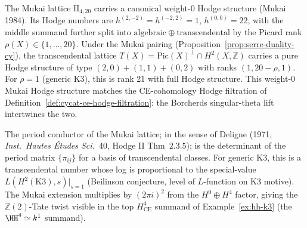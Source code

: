 \begin{remark}
\label{rem:dcy-mukai-hodge-conductor}
The Mukai lattice $\mathrm{II}_{4,20}$ carries a canonical weight-$0$
Hodge structure (Mukai 1984). Its Hodge numbers are
$h^{(2,-2)} = h^{(-2,2)} = 1$, $h^{(0,0)} = 22$, with the middle
summand further split into $\mathrm{algebraic}\oplus\mathrm{transcendental}$
by the Picard rank $\rho(X) \in \{1, \ldots, 20\}$. Under the Mukai
pairing (Proposition~\textup{\ref{prop:serre-duality-cy}}), the
transcendental lattice
$T(X) = \mathrm{Pic}(X)^\perp \cap H^2(X,\mathbb{Z})$ carries a pure
Hodge structure of type $(2,0) + (1,1) + (0,2)$ with ranks
$(1, 20 - \rho, 1)$. For $\rho = 1$ (generic K3), this is rank 21
with full Hodge structure. This weight-$0$ Mukai Hodge structure
matches the CE-cohomology Hodge filtration of
Definition~\textup{\ref{def:cycat-ce-hodge-filtration}}:
the Borcherds singular-theta lift intertwines the two.

The period conductor of the Mukai lattice; in the sense of
Deligne (1971, \emph{Inst.\ Hautes \'Etudes Sci.}~40, Hodge II
Thm~$2.3.5$); is the determinant of the period matrix
$\{\pi_{ij}\}$ for a basis of transcendental classes. For generic
K3, this is a transcendental number whose log is proportional to
the special-value $L(H^2(\mathrm{K3}), s)|_{s=1}$ (Beilinson
conjecture, level of $L$-function on K3 motive). The Mukai
extension multiplies by $(2\pi i)^2$ from the $H^0 \oplus H^4$
factor, giving the $\mathbb{Z}(2)$-Tate twist visible in the top
$H^4_{\mathrm{CE}}$ summand of Example~\textup{\ref{ex:hh-k3}}
(the $\HH^4 \simeq k^1$ summand).
\end{remark}

